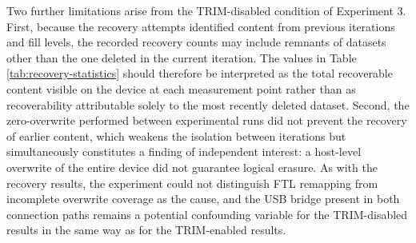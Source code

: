 Two further limitations arise from the TRIM-disabled condition of Experiment 3. First, because the recovery attempts identified content from previous iterations and 
fill levels, the recorded recovery counts may include remnants of datasets other than the one deleted in the current iteration. The values in Table \ref{tab:recovery-statistics} 
should therefore be interpreted as the total recoverable content visible on the device at each measurement point rather than as recoverability attributable solely to 
the most recently deleted dataset. Second, the zero-overwrite performed between experimental runs did not prevent the recovery of earlier content, which weakens the 
isolation between iterations but simultaneously constitutes a finding of independent interest: a host-level overwrite of the entire device did not guarantee logical 
erasure. As with the recovery results, the experiment could not distinguish FTL remapping from incomplete overwrite coverage as the cause, and the USB bridge present in 
both connection paths remains a potential confounding variable for the TRIM-disabled results in the same way as for the TRIM-enabled results.